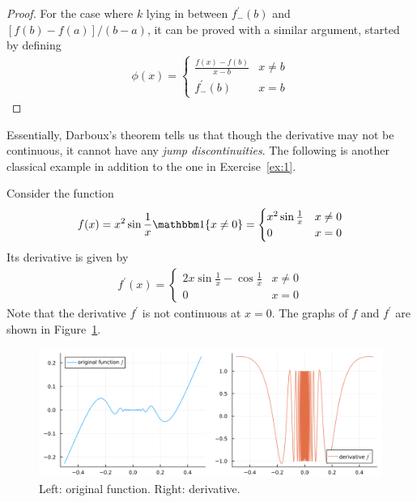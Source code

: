 \documentclass[thmcnt=section, 12pt]{my-elegantbook}
\begin{document}
\begin{proof}
    \par For the case where $k$ lying in between $f^\prime_{-}(b)$ and $[f(b) - f(a)] / (b-a)$, it can be proved with a similar argument, started by defining
    \begin{align*}
        \phi(x) = \begin{cases}
                      \frac{f(x) - f(b)}{x - b}
                       & x \neq b \\
                      f^\prime_{-}(b)
                       & x = b
                  \end{cases}
    \end{align*}
\end{proof}

\par Essentially, Darboux's theorem tells us that though the derivative may not be continuous, it cannot have any \textit{jump discontinuities}. The following is another classical example in addition to the one in Exercise~\ref{ex:1}.

\begin{example}
    Consider the function
    \begin{align*}
        f(x) = x^2 \sin\frac{1}{x} \ind\{x \neq 0\}
        = \begin{cases}
              x^2 \sin\frac{1}{x}
                & x \neq 0 \\
              0 & x = 0
          \end{cases}
    \end{align*}
    Its derivative is given by
    \begin{align*}
        f^\prime(x)
        = \begin{cases}
              2x \sin\frac{1}{x} - \cos\frac{1}{x}
                & x \neq 0 \\
              0 & x = 0
          \end{cases}
    \end{align*}
    Note that the derivative $f^\prime$ is not continuous at $x = 0$. The graphs of $f$ and $f^\prime$ are shown in Figure~\ref{fig:6}.
    \begin{figure}[ht]
        \centering
        \includegraphics[scale=0.2]{figures/graph-007.png}
        \caption{Left: original function. Right: derivative.}
        \label{fig:6}
    \end{figure}
\end{example}
\end{document}
